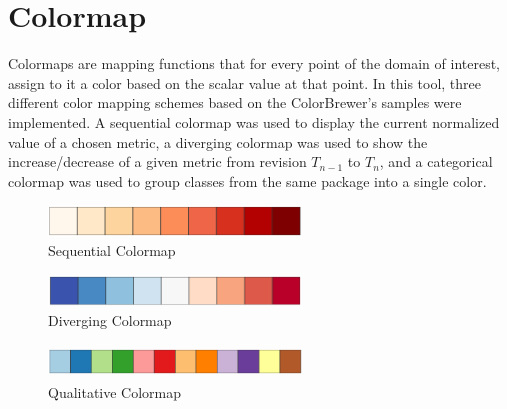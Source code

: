 \section{Colormap} \label{sec:colormap}
Colormaps are mapping functions that for every point of the domain of interest, assign to it a color based on the scalar value at that point. In this tool, three different color mapping schemes based on the ColorBrewer's \cite{ref:colorbrewer} samples were implemented. A sequential colormap was used to display the current normalized value of a chosen metric, a diverging colormap was used to show the increase/decrease of a given metric from revision $T_{n-1}$ to $T_{n}$, and a categorical colormap was used to group classes from the same package into a single color.

\begin{figure}[H]
  \centering
  \includegraphics[width=0.6\textwidth]{figures/seq.png}
  \caption{Sequential Colormap}
  \label{fig:seq}
\end{figure}

\begin{figure}[H]
  \centering
  \includegraphics[width=0.6\textwidth]{figures/div.png}
  \caption{Diverging Colormap}
  \label{fig:div}
\end{figure}

\begin{figure}[H]
  \centering
  \includegraphics[width=0.6\textwidth,height=0.9cm]{figures/quali.png}
  \caption{Qualitative Colormap}
  \label{fig:quali}
\end{figure}
